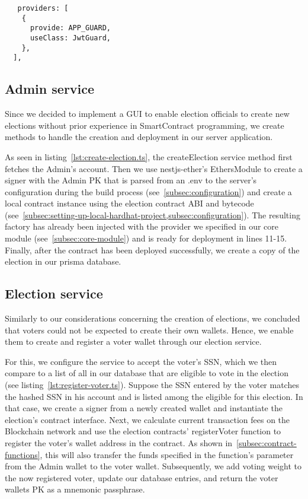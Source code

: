 \begin{verbatim}
   providers: [
    {
      provide: APP_GUARD,
      useClass: JwtGuard,
    },
  ],
\end{verbatim}

\subsection{Admin service}\label{subsec:admin-service}

Since we decided to implement a \gls{GUI} to enable election officials to create new elections without prior experience in \gls{SmartContract} programming, we create methods to handle the creation and deployment in our server application.

As seen in listing~\ref{lst:create-election.ts}, the createElection service method first fetches the \gls{Admin}'s account.
Then we use nestjs-ether's EthersModule to create a signer with the \gls{Admin} \gls{PK} that is parsed from an .env to the server's configuration during the build process (see~\cref{subsec:configuration}) and create a local contract instance using the election contract \gls{ABI} and bytecode (see~\cref{subsec:setting-up-local-hardhat-project,subsec:configuration}).
The resulting factory has already been injected with the provider we specified in our core module (see~\cref{subsec:core-module}) and is ready for deployment in lines 11-15.
Finally, after the contract has been deployed successfully, we create a copy of the election in our prisma database.


\subsection{Election service}\label{subsec:election-service}

Similarly to our considerations concerning the creation of elections, we concluded that voters could not be expected to create their own wallets.
Hence, we enable them to create and register a voter wallet through our election service.

For this, we configure the service to accept the voter's \gls{SSN}, which we then compare to a list of all  in our database that are eligible to vote in the election (see listing~\ref{lst:register-voter.ts}).
Suppose the \gls{SSN} entered by the voter matches the hashed \gls{SSN} in his account and is listed among the eligible  for this election.
In that case, we create a signer from a newly created wallet and instantiate the election's contract interface.
Next, we calculate current transaction fees on the \gls{Blockchain} network and use the election contracts' registerVoter function to register the voter's wallet address in the contract.
As shown in~\cref{subsec:contract-functions}, this will also transfer the funds specified in the function's parameter from the \gls{Admin} wallet to the voter wallet.
Subsequently, we add voting weight to the now registered voter, update our database entries, and return the voter wallets \gls{PK} as a mnemonic passphrase.

